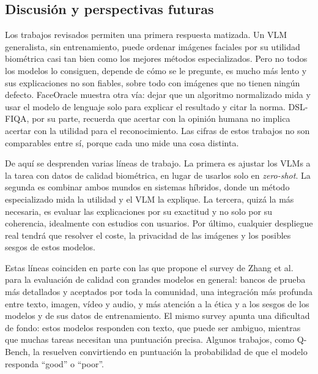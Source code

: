 \subsection{Discusión y perspectivas futuras}
\label{sec:discusion}
Los trabajos revisados permiten una primera respuesta matizada. Un VLM generalista, sin entrenamiento, puede ordenar imágenes faciales por su utilidad biométrica casi tan bien como los mejores métodos especializados. Pero no todos los modelos lo consiguen, depende de cómo se le pregunte, es mucho más lento y sus explicaciones no son fiables, sobre todo con imágenes que no tienen ningún defecto. FaceOracle muestra otra vía: dejar que un algoritmo normalizado mida y usar el modelo de lenguaje solo para explicar el resultado y citar la norma. DSL-FIQA, por su parte, recuerda que acertar con la opinión humana no implica acertar con la utilidad para el reconocimiento. Las cifras de estos trabajos no son comparables entre sí, porque cada uno mide una cosa distinta.

De aquí se desprenden varias líneas de trabajo. La primera es ajustar los VLMs a la tarea con datos de calidad biométrica, en lugar de usarlos solo en \textit{zero-shot}. La segunda es combinar ambos mundos en sistemas híbridos, donde un método especializado mida la utilidad y el VLM la explique. La tercera, quizá la más necesaria, es evaluar las explicaciones por su exactitud y no solo por su coherencia, idealmente con estudios con usuarios. Por último, cualquier despliegue real tendrá que resolver el coste, la privacidad de las imágenes y los posibles sesgos de estos modelos.

Estas líneas coinciden en parte con las que propone el survey de Zhang et al.~\cite{Zhang_2025_TOMM} para la evaluación de calidad con grandes modelos en general: bancos de prueba más detallados y aceptados por toda la comunidad, una integración más profunda entre texto, imagen, vídeo y audio, y más atención a la ética y a los sesgos de los modelos y de sus datos de entrenamiento. El mismo survey apunta una dificultad de fondo: estos modelos responden con texto, que puede ser ambiguo, mientras que muchas tareas necesitan una puntuación precisa. Algunos trabajos, como Q-Bench, la resuelven convirtiendo en puntuación la probabilidad de que el modelo responda ``good'' o ``poor''.
